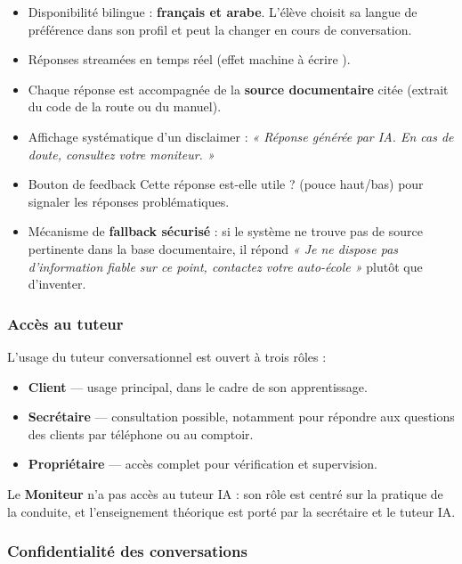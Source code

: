 \documentclass[12pt,a4paper]{article}
\newcommand{\role}[1]{\textbf{\color{accent}#1}}
\begin{document}
\begin{itemize}[leftmargin=*,itemsep=4pt]
    \item Disponibilité bilingue : \textbf{français et arabe}. L'élève choisit sa langue de préférence dans son profil et peut la changer en cours de conversation.
    \item Réponses streamées en temps réel (effet \og machine à écrire \fg{}).
    \item Chaque réponse est accompagnée de la \textbf{source documentaire} citée (extrait du code de la route ou du manuel).
    \item Affichage systématique d'un disclaimer : \textit{« Réponse générée par IA. En cas de doute, consultez votre moniteur. »}
    \item Bouton de feedback \og Cette réponse est-elle utile ? \fg{} (pouce haut/bas) pour signaler les réponses problématiques.
    \item Mécanisme de \textbf{fallback sécurisé} : si le système ne trouve pas de source pertinente dans la base documentaire, il répond \textit{« Je ne dispose pas d'information fiable sur ce point, contactez votre auto-école »} plutôt que d'inventer.
\end{itemize}

\subsubsection{Accès au tuteur}

L'usage du tuteur conversationnel est ouvert à trois rôles :

\begin{itemize}[leftmargin=*,itemsep=4pt]
    \item \role{Client} --- usage principal, dans le cadre de son apprentissage.
    \item \role{Secrétaire} --- consultation possible, notamment pour répondre aux questions des clients par téléphone ou au comptoir.
    \item \role{Propriétaire} --- accès complet pour vérification et supervision.
\end{itemize}

Le \role{Moniteur} n'a pas accès au tuteur IA : son rôle est centré sur la pratique de la conduite, et l'enseignement théorique est porté par la secrétaire et le tuteur IA.

\subsubsection{Confidentialité des conversations}
\end{document}
